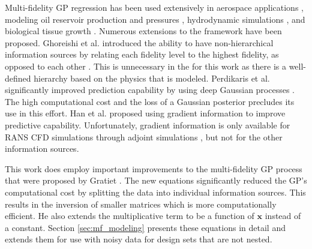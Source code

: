 Multi-fidelity GP regression has been used extensively in aerospace applications \cite{lam_surrogate_nodate,menhorn_multifideliy_nodate}, modeling oil reservoir production and pressures \cite{kennedy_predicting_2000}, hydrodynamic simulations \cite{le_gratiet_recursive_2014}, and biological tissue growth \cite{lee2020propagation}.
Numerous extensions to the framework have been proposed.
Ghoreishi et al. introduced the ability to have non-hierarchical information sources by relating each fidelity level to the highest fidelity, as opposed to each other \cite{ghoreishi_gaussian_2018}. 
This is unnecessary in the for this work as there is a well-defined hierarchy based on the physics that is modeled. 
Perdikaris et al. \cite{perdikaris_nonlinear_2017} significantly improved prediction capability by using deep Gaussian processes \cite{damianou2013deep}.
The high computational cost and the loss of a Gaussian posterior precludes its use in this effort. 
Han et al. \cite{han_improving_2013} proposed using gradient information to improve predictive capability.
Unfortunately, gradient information is only available for RANS CFD simulations through adjoint simulations \cite{jameson1988aerodynamic}, but not for the other information sources. 

This work does employ important improvements to the multi-fidelity GP process that were proposed by Gratiet \cite{gratiet_multi-fidelity_nodate}.
The new equations significantly reduced the GP's computational cost by splitting the data into individual information sources.
This results in the inversion of smaller matrices which is more computationally efficient. 
He also extends the multiplicative term to be a function of $\mathbf{x}$ instead of a constant.
Section \ref{sec:mf_modeling} presents these equations in detail and extends them for use with noisy data for design sets that are not nested. 